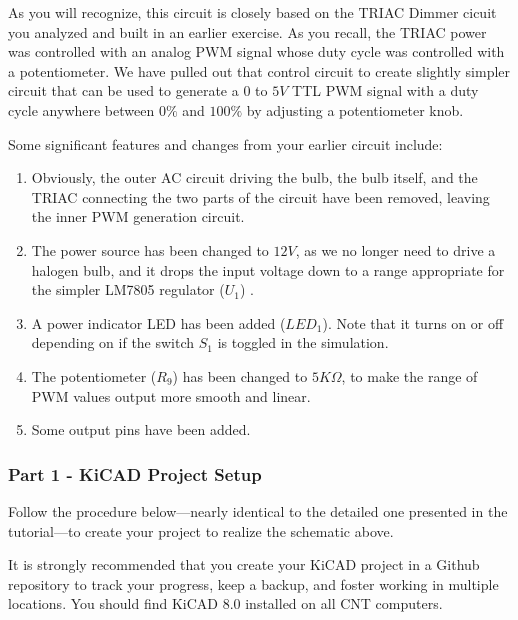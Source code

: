 \documentclass[
  letterpaper,
  DIV=11,
  numbers=noendperiod,
  oneside]{scrartcl}
\begin{document}
As you will recognize, this circuit is closely based on the TRIAC Dimmer
cicuit you analyzed and built in an earlier exercise. As you recall, the
TRIAC power was controlled with an analog PWM signal whose duty cycle was controlled with a
potentiometer. We have pulled out that control circuit to create
slightly simpler circuit that can be used to generate a \(0\) to \(5 V\)
TTL PWM signal with a duty cycle anywhere between \(0\%\) and \(100\%\)
by adjusting a potentiometer knob.

Some significant features and changes from your earlier circuit include:

\begin{enumerate}
\def\labelenumi{\arabic{enumi}.}
\item
  Obviously, the outer AC circuit driving the bulb, the bulb itself, and
  the TRIAC connecting the two parts of the circuit have been removed,
  leaving the inner PWM generation circuit.
\item
  The power source has been changed to \(12V\), as we no longer need to
  drive a halogen bulb, and it drops the input voltage down to a range
  appropriate for the simpler LM7805 regulator (\(U_1\)) .
\item
  A power indicator LED has been added (\(LED_1\)). Note that it turns
  on or off depending on if the switch \(S_1\) is toggled in the
  simulation.
\item
  The potentiometer (\(R_9\)) has been changed to \(5K\Omega\), to make
  the range of PWM values output more smooth and linear.
\item
  Some output pins have been added.
\end{enumerate}

\subsubsection{Part 1 - KiCAD Project
Setup}\label{part-1---kicad-project-setup}

Follow the procedure below---nearly identical to the detailed one
presented in the tutorial---to create your project to realize the
schematic above.

\begin{tcolorbox}[enhanced jigsaw, arc=.35mm, opacitybacktitle=0.6, titlerule=0mm, title=\textcolor{quarto-callout-note-color}{\faInfo}\hspace{0.5em}{Note}, coltitle=black, colframe=quarto-callout-note-color-frame, rightrule=.15mm, colback=white, bottomtitle=1mm, toprule=.15mm, bottomrule=.15mm, colbacktitle=quarto-callout-note-color!10!white, leftrule=.75mm, breakable, left=2mm, opacityback=0, toptitle=1mm]

It is strongly recommended that you create your KiCAD project in a
Github repository to track your progress, keep a backup, and foster
working in multiple locations. You should find KiCAD 8.0 installed on
all CNT computers.

\end{tcolorbox}
\end{document}
